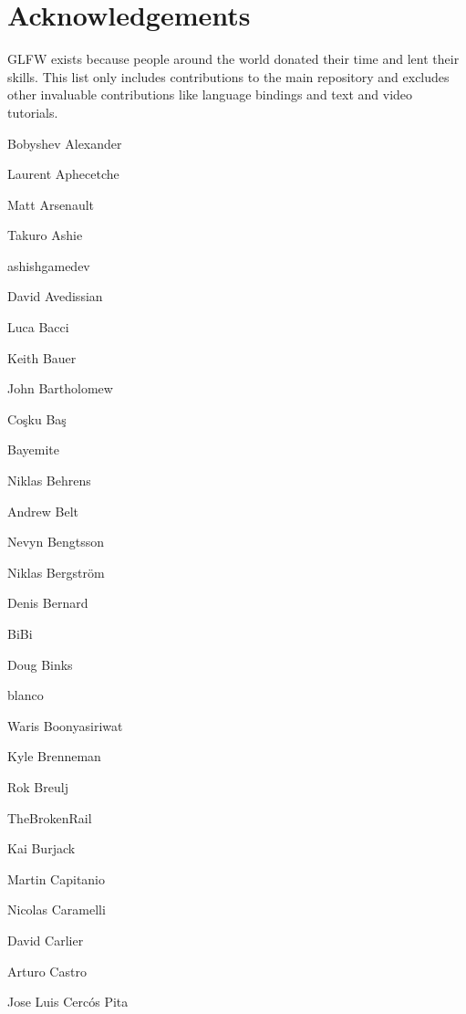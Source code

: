 \chapter{Acknowledgements}
\hypertarget{md_runtime_2glfw_2_c_o_n_t_r_i_b_u_t_o_r_s}{}\label{md_runtime_2glfw_2_c_o_n_t_r_i_b_u_t_o_r_s}
\label{md_runtime_2glfw_2_c_o_n_t_r_i_b_u_t_o_r_s_autotoc_md80}%
%


GLFW exists because people around the world donated their time and lent their skills. This list only includes contributions to the main repository and excludes other invaluable contributions like language bindings and text and video tutorials.


\begin{DoxyItemize}
\item Bobyshev Alexander
\item Laurent Aphecetche
\item Matt Arsenault
\item Takuro Ashie
\item ashishgamedev
\item David Avedissian
\item Luca Bacci
\item Keith Bauer
\item John Bartholomew
\item Coşku Baş
\item Bayemite
\item Niklas Behrens
\item Andrew Belt
\item Nevyn Bengtsson
\item Niklas Bergström
\item Denis Bernard
\item Bi\+Bi
\item Doug Binks
\item blanco
\item Waris Boonyasiriwat
\item Kyle Brenneman
\item Rok Breulj
\item The\+Broken\+Rail
\item Kai Burjack
\item Martin Capitanio
\item Nicolas Caramelli
\item David Carlier
\item Arturo Castro
\item Jose Luis Cercós Pita

\end{DoxyItemize}
